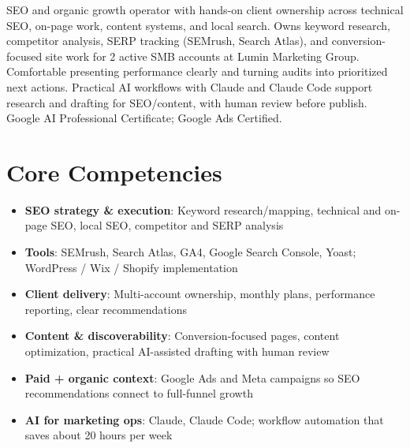 \documentclass[11pt,a4paper,sans]{moderncv}
\begin{document}
\makecvtitle

\vspace{6pt}
\small{SEO and organic growth operator with hands-on client ownership across technical SEO, on-page work, content systems, and local search. Owns keyword research, competitor analysis, SERP tracking (SEMrush, Search Atlas), and conversion-focused site work for 2 active SMB accounts at Lumin Marketing Group. Comfortable presenting performance clearly and turning audits into prioritized next actions. Practical AI workflows with Claude and Claude Code support research and drafting for SEO/content, with human review before publish. Google AI Professional Certificate; Google Ads Certified.}

\section{Core Competencies}
\vspace{1pt}
\begin{itemize}
\item \textbf{SEO strategy \& execution}: Keyword research/mapping, technical and on-page SEO, local SEO, competitor and SERP analysis
\item \textbf{Tools}: SEMrush, Search Atlas, GA4, Google Search Console, Yoast; WordPress / Wix / Shopify implementation
\item \textbf{Client delivery}: Multi-account ownership, monthly plans, performance reporting, clear recommendations
\item \textbf{Content \& discoverability}: Conversion-focused pages, content optimization, practical AI-assisted drafting with human review
\item \textbf{Paid + organic context}: Google Ads and Meta campaigns so SEO recommendations connect to full-funnel growth
\item \textbf{AI for marketing ops}: Claude, Claude Code; workflow automation that saves about 20 hours per week
\end{itemize}
\end{document}
